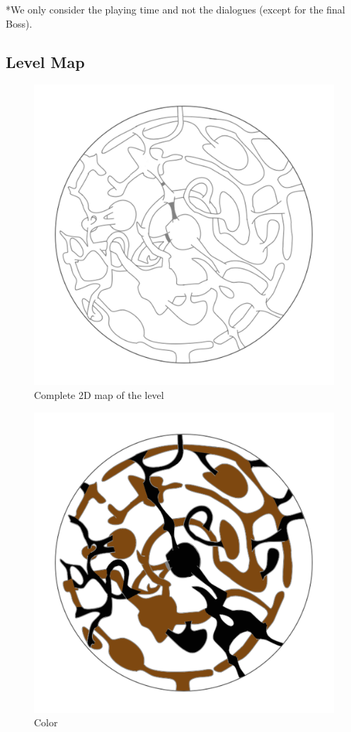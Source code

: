*We only consider the playing time and not the dialogues (except for the final Boss).\\


\subsection{Level Map}

\begin{figure}[H]
	\centering
	\includegraphics[width=0.55\linewidth]{images/map/map_clear.png}
	\caption*{Complete 2D map of the level}
\end{figure}

\begin{figure}[H]
	\centering
	\includegraphics[width=0.7\linewidth]{images/map/2D_map_color.png}
	\caption*{Color}
\end{figure}


